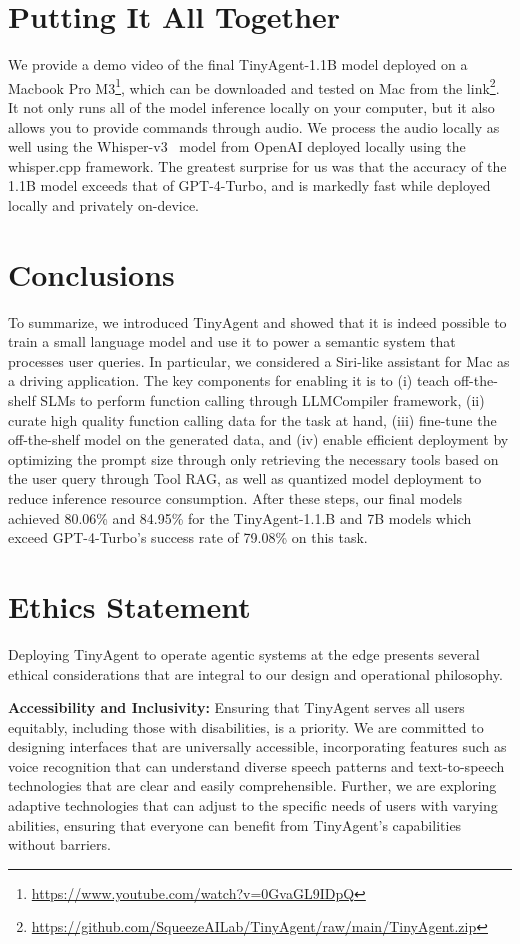 \section{Putting It All Together}
We provide a demo video of the final TinyAgent-1.1B model deployed on a Macbook Pro M3\footnote{\url{https://www.youtube.com/watch?v=0GvaGL9IDpQ}}, which can be downloaded and tested on Mac from the link\footnote{\url{https://github.com/SqueezeAILab/TinyAgent/raw/main/TinyAgent.zip}}.
It not only runs all of the model inference locally on your computer, but it also allows you to provide commands through audio. We process the audio locally as well using the Whisper-v3~\cite{radford2022robust} model from OpenAI deployed locally using the whisper.cpp framework. The greatest surprise for us was that the accuracy of the 1.1B model exceeds that of GPT-4-Turbo, and is markedly fast while deployed locally and privately on-device.
\section{Conclusions}

To summarize, we introduced TinyAgent and showed that it is indeed possible to train a small language model and use it to power a semantic system that processes user queries. In particular, we considered a Siri-like assistant for Mac as a driving application. The key components for enabling it is to (i) teach off-the-shelf SLMs to perform function calling through LLMCompiler framework, (ii) curate high quality function calling data for the task at hand, (iii) fine-tune the off-the-shelf model on the generated data, and (iv) enable efficient deployment by optimizing the prompt size through only retrieving the necessary tools based on the user query through Tool RAG, as well as quantized model deployment to reduce inference resource consumption. After these steps, our final models achieved 80.06\% and 84.95\% for the TinyAgent-1.1.B and 7B models which exceed GPT-4-Turbo’s success rate of 79.08\% on this task.
\section{Ethics Statement}

Deploying TinyAgent to operate agentic systems at the edge presents several ethical considerations that are integral to our design and operational philosophy.

\textbf{Accessibility and Inclusivity:} Ensuring that TinyAgent serves all users equitably, including those with disabilities, is a priority. We are committed to designing interfaces that are universally accessible, incorporating features such as voice recognition that can understand diverse speech patterns and text-to-speech technologies that are clear and easily comprehensible. Further, we are exploring adaptive technologies that can adjust to the specific needs of users with varying abilities, ensuring that everyone can benefit from TinyAgent’s capabilities without barriers.

